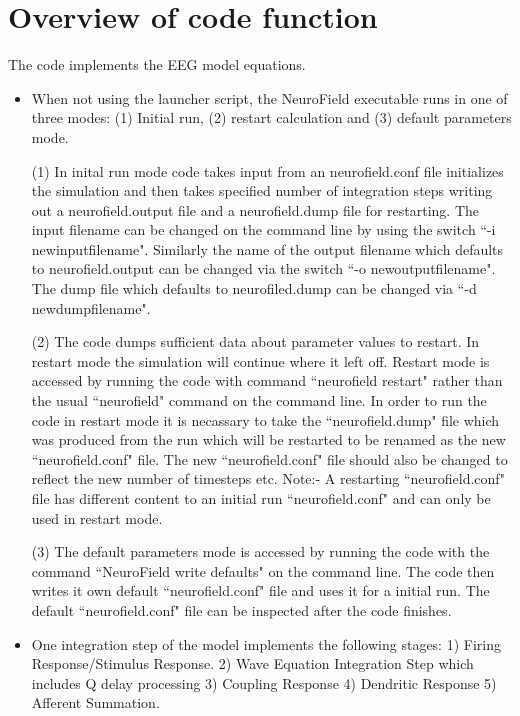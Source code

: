 \documentclass[12pt,a4paper]{article}
\begin{document}
\section{Overview of code function}

The code implements the EEG model equations.

\begin{itemize}

\item When not using the launcher script, the NeuroField executable runs in one of three modes: (1) Initial run,
(2) restart calculation and (3) default parameters mode.

(1) In inital run mode
code takes input from an neurofield.conf file
initializes the simulation and then takes specified number of integration steps
writing out a neurofield.output file and a neurofield.dump file for restarting.
The input filename can be changed on the command line by using the switch
``-i newinputfilename". Similarly the name of the output filename which defaults
to neurofield.output can be changed via the switch ``-o newoutputfilename". The
dump file which defaults to neurofiled.dump can be changed via ``-d newdumpfilename".

(2) The code dumps sufficient data about parameter values to restart. In
restart mode the simulation will continue where it left off. Restart mode is
accessed by running the code with command ``neurofield restart" rather than
the usual ``neurofield" command on the command line. In order to run the code in restart
mode it is necassary to take the ``neurofield.dump" file which was produced from
the run which will be restarted to be renamed as the
new ``neurofield.conf" file. The new ``neurofield.conf"
file should also be changed to reflect the new number of timesteps etc.
Note:- A restarting ``neurofield.conf" file has different content to an initial run
``neurofield.conf" and can only be used in restart mode.

(3) The default parameters
mode is accessed by running the code with the command ``NeuroField write defaults"
on the command line. The code then writes it own default ``neurofield.conf" file
and uses it for a initial run. The default ``neurofield.conf" file can be 
inspected after the code finishes.

\item One integration step of the model implements the following stages:
1) Firing Response/Stimulus Response. 2) Wave Equation Integration Step
which includes Q delay processing 3) Coupling Response 4) Dendritic Response
5) Afferent Summation.


\end{itemize}
\end{document}

